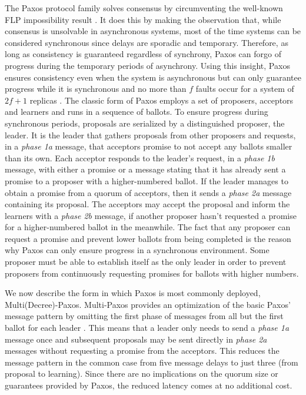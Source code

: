 \documentclass[runningheads,a4paper]{llncs}
\begin{document}
The Paxos protocol family solves consensus by circumventing the well-known FLP impossibility result \cite{Fischer1985}. It does this by making the observation that, while consensus is unsolvable in asynchronous systems, most of the time systems can be considered synchronous since delays are sporadic and temporary. Therefore, as long as consistency is guaranteed regardless of synchrony, Paxos can forgo of progress during the temporary periods of asynchrony. Using this insight, Paxos ensures consistency even when the system is asynchronous but can only guarantee progress while it is synchronous and no more than $f$ faults occur for a system of $2f+1$ replicas \cite{Lamport2001}. The classic form of Paxos employs a set of proposers, acceptors and learners and runs in a sequence of ballots. To ensure progress during synchronous periods, proposals are serialized by a distinguished proposer, the leader. It is the leader that gathers proposals from other proposers and requests, in a \textit{phase 1a} message, that acceptors promise to not accept any ballots smaller than its own. Each acceptor responds to the leader's request, in a \textit{phase 1b} message, with either a promise or a message stating that it has already sent a promise to a proposer with a higher-numbered ballot. If the leader manages to obtain a promise from a quorum of acceptors, then it sends a \textit{phase 2a} message containing its proposal. The acceptors may accept the proposal and inform the learners with a \textit{phase 2b} message, if another proposer hasn't requested a promise for a higher-numbered ballot in the meanwhile. The fact that any proposer can request a promise and prevent lower ballots from being completed is the reason why Paxos can only ensure progress in a synchronous environment. Some proposer must be able to establish itself as the only leader in order to prevent proposers from continuously requesting promises for ballots with higher numbers. \par
We now describe the form in which Paxos is most commonly deployed, Multi(Decree)-Paxos. Multi-Paxos provides an optimization of the basic Paxos' message pattern by omitting the first phase of messages from all but the first ballot for each leader \cite{Renesse2011}. This means that a leader only needs to send a \textit{phase 1a} message once and subsequent proposals may be sent directly in \textit{phase 2a} messages without requesting a promise from the acceptors. This reduces the message pattern in the common case from five message delays to just three (from proposal to learning). Since there are no implications on the quorum size or guarantees provided by Paxos, the reduced latency comes at no additional cost. \par
\end{document}
